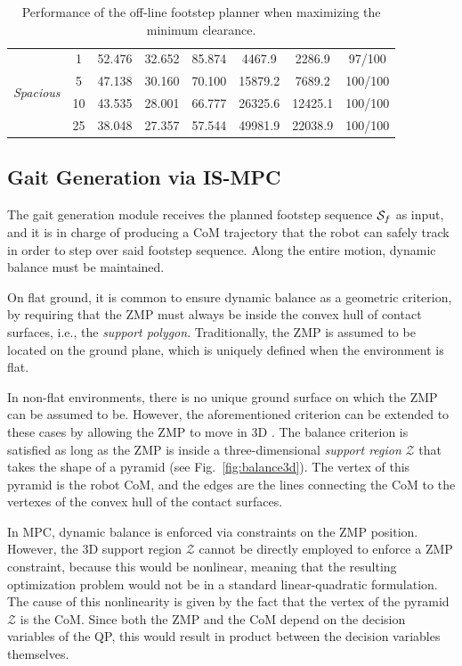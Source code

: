 \begin{table}
\begin{tabular}{*{8}{c}}
        \hline   
        \multirow{4}{*}{\textit{Spacious}} & 1 & 52.476 & 32.652 & 85.874 & 4467.9 & 2286.9 & 97/100 \\
         & 5 & 47.138 & 30.160 & 70.100 & 15879.2 & 7689.2 & 100/100 \\
         & 10 & 43.535 & 28.001 & 66.777 & 26325.6 & 12425.1 & 100/100 \\
         & 25 & 38.048 & 27.357 & 57.544 & 49981.9 & 22038.9 & 100/100 \\ 
        
    \end{tabular}
    \caption{Performance of the off-line footstep planner when maximizing the minimum clearance.}
    \label{tab:benchmark:off-line:clearance}
\end{table}

\subsection{Gait Generation via IS-MPC}
\label{sec:offlineCase:GaitGeneration}
The gait generation module receives the planned footstep sequence ${\cal S}_f$ as input, and it is in charge of producing a CoM trajectory that the robot can safely track in order to step over said footstep sequence. Along the entire motion, dynamic balance must be maintained.

On flat ground, it is common to ensure dynamic balance as a geometric criterion, by requiring that the ZMP must always be inside the convex hull of contact surfaces, i.e., the \emph{support polygon}. Traditionally, the ZMP is assumed to be located on the ground plane, which is uniquely defined when the environment is flat.

In non-flat environments, there is no unique ground surface on which the ZMP can be assumed to be. However, the aforementioned criterion can be extended to these cases by allowing the ZMP to move in 3D \cite{SuImYaCa:2021}. The balance criterion is satisfied as long as the ZMP is inside a three-dimensional \emph{support region} $\mathcal{Z}$ that takes the shape of a pyramid (see Fig.~\ref{fig:balance3d}). The vertex of this pyramid is the robot CoM, and the edges are the lines connecting the CoM to the vertexes of the convex hull of the contact surfaces.

In MPC, dynamic balance is enforced via constraints on the ZMP position. However, the 3D support region $\mathcal{Z}$ cannot be directly employed to enforce a ZMP constraint, because this would be nonlinear, meaning that the resulting optimization problem would not be in a standard linear-quadratic formulation. The cause of this nonlinearity is given by the fact that the vertex of the pyramid $\mathcal{Z}$ is the CoM. Since both the ZMP and the CoM depend on the decision variables of the QP, this would result in product between the decision variables themselves.

